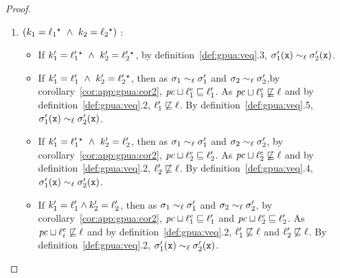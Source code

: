 \begin{proof}
\begin{enumerate}
\begin{itemize}
\begin{enumerate}
\item $(k_1 =   \ell_1{}^\star   ~\wedge~k_2 =  
  \ell_2{}^\star  )$ :
 \begin{itemize}
\item If $k_1' =  \ell_1'{}^\star   ~\wedge~k_2' =
 \ell_2'{}^\star  $, by definition~\ref{def:gpua:veq}.3,
$\sigma_1'(\texttt{x})   \sim_\ell \sigma_2'(\texttt{x})$.
\item If $k_1' = \ell_1' ~\wedge~k_2' =  \ell_2'{}^\star  $, then as $\sigma_1
  \sim_\ell \sigma_1'$ and $\sigma_2 \sim_\ell \sigma_2'$,by 
corollary~\ref{cor:app:gpua:cor2}, $\mathit{pc} \sqcup \ell^e_1 \sqsubseteq \ell_1'$. As $\mathit{pc} \sqcup \ell^e_1 \not\sqsubseteq \ell$ and
  by  definition~\ref{def:gpua:veq}.2,
  $\ell_1' \not\sqsubseteq \ell$.
  By definition~\ref{def:gpua:veq}.5, $\sigma_1'(\texttt{x})
  \sim_\ell \sigma_2'(\texttt{x})$.
\item  If $k_1' =  \ell_1'{}^\star   ~\wedge~k_2' = \ell_2'$, then as $\sigma_1
  \sim_\ell \sigma_1'$ and $\sigma_2 \sim_\ell \sigma_2'$, by 
corollary~\ref{cor:app:gpua:cor2}, $\mathit{pc} \sqcup \ell^e_2 \sqsubseteq \ell_2'$. As $\mathit{pc} \sqcup
  \ell^e_2 \not\sqsubseteq \ell$ and
  by definition~\ref{def:gpua:veq}.2,
  $\ell_2' \not\sqsubseteq \ell$.
  By definition~\ref{def:gpua:veq}.4, $\sigma_1'(\texttt{x})
  \sim_\ell \sigma_2'(\texttt{x})$.
\item If $k_1' = \ell_1' \wedge k_2' = \ell_2'$, then as $\sigma_1
  \sim_\ell \sigma_1'$ and $\sigma_2 \sim_\ell \sigma_2'$, by 
  corollary~\ref{cor:app:gpua:cor2}, $\mathit{pc} \sqcup \ell^e_1 \sqsubseteq \ell_1'$ and $\mathit{pc} \sqcup \ell^e_2 \sqsubseteq \ell_2'$. As
  $\mathit{pc} \sqcup \ell^e_i \not\sqsubseteq \ell$ and by definition~\ref{def:gpua:veq}.2, $\ell_1'
  \not\sqsubseteq \ell$ and 
  $\ell_2' \not\sqsubseteq \ell$.
  By definition~\ref{def:gpua:veq}.2, $\sigma_1'(\texttt{x})
  \sim_\ell \sigma_2'(\texttt{x})$.
 \end{itemize}


\end{enumerate}
\end{itemize}
\end{enumerate}
\end{proof}
